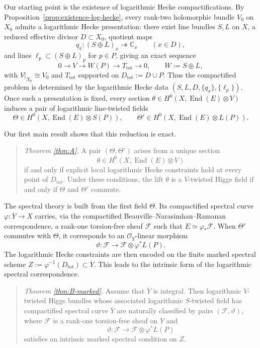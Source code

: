 \documentclass[a4paper,12pt]{amsart}
\numberwithin{equation}{section}
\theoremstyle{definition}
\newcommand{\End}{\operatorname{End}}
\begin{document}
Our starting point is the existence of logarithmic Hecke compactifications. By Proposition~\ref{prop:existence-log-hecke}, every rank-two holomorphic bundle \(V_0\) on \(X_0\) admits a logarithmic Hecke presentation: there exist line bundles \(S,L\) on \(X\), a reduced effective divisor \(D\subset X_0\), quotient maps
\[
q_x:(S\oplus L)_x\twoheadrightarrow \mathbb C_x \qquad (x\in D),
\]
and lines \(\ell_p\subset (S\oplus L)_p\) for \(p\in P\), giving an exact sequence
\begin{equation}\label{eq:intro-log-hecke-short}
0\longrightarrow V \longrightarrow W(P)\longrightarrow T_{\mathrm{tot}}\longrightarrow 0,
\qquad W:=S\oplus L,
\end{equation}
with \(V|_{X_0}\cong V_0\) and \(T_{\mathrm{tot}}\) supported on
\(
D_{\mathrm{tot}}:=D\cup P.
\)
Thus the compactified problem is determined by the logarithmic Hecke data
\(
(S,L,D,\{q_x\},\{\ell_p\}).
\)
Once such a presentation is fixed, every section
\(
\theta\in H^0(X,\End(E)\otimes V)
\)
induces a pair of logarithmic line-twisted fields
\[
\Theta\in H^0(X,\End(E)\otimes S(P)),
\qquad
\Theta'\in H^0(X,\End(E)\otimes L(P)).
\]

Our first main result shows that this reduction is exact.

\begin{quote}
\emph{Theorem \ref{thm:A}.}
A pair \((\Theta,\Theta')\) arises from a unique section
\[
\theta\in H^0(X,\End(E)\otimes V)
\]
if and only if explicit local logarithmic Hecke constraints hold at every point of \(D_{\mathrm{tot}}\). Under these conditions, the lift \(\theta\) is a \(V\)-twisted Higgs field if and only if \(\Theta\) and \(\Theta'\) commute.
\end{quote}

The spectral theory is built from the first field \(\Theta\). Its compactified spectral curve
\(
\varphi:\overline{Y}\longrightarrow X
\)
carries, via the compactified Beauville--Narasimhan--Ramanan correspondence, a rank-one torsion-free sheaf \(\mathcal F\) such that \(E\simeq \varphi_*\mathcal F\). When \(\Theta'\) commutes with \(\Theta\), it corresponds to an \(\mathcal O_{\overline{Y}}\)-linear morphism
\[
\vartheta:\mathcal F\longrightarrow \mathcal F\otimes \varphi^*L(P).
\]
The logarithmic Hecke constraints are then encoded on the finite marked spectral scheme
\(
Z:=\varphi^{-1}(D_{\mathrm{tot}})\subset \overline{Y}.
\)  This leads to the intrinsic form of the logarithmic spectral correspondence.

\begin{quote}
\emph{Theorem \ref{thm:B-marked}.}
Assume that \(\overline{Y}\) is integral. Then logarithmic \(V\)-twisted Higgs bundles whose associated logarithmic \(S\)-twisted field has compactified spectral curve \(\overline{Y}\) are naturally classified by pairs \((\mathcal F,\vartheta)\), where \(\mathcal F\) is a rank-one torsion-free sheaf on \(\overline{Y}\) and
\[
\vartheta:\mathcal F\longrightarrow \mathcal F\otimes \varphi^*L(P)
\]
satisfies an intrinsic marked spectral condition on \(Z\).
\end{quote}
\end{document}
